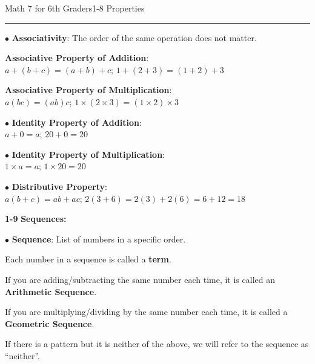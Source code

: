 \begin{enumerate*}
\begin{enumerate*}
\newpage
\noindent\Large{Math 7 for 6th Graders\hfill 1-8 Properties}
\noindent\hrule
\vspace{5mm}
					
				\item[$\bullet$]\textbf{Associativity}: The order of the same operation does not matter.\\
					\item[]\textbf{Associative Property of Addition}:\\
						$a+(b+c)=(a+b)+c$; $1+(2+3)=(1+2)+3$\\
					\item[]\textbf{Associative Property of Multiplication}:\\
						$a(bc)=(ab)c$; $1\times(2\times3)=(1\times2)\times3$\\
				\item[$\bullet$]\textbf{Identity Property of Addition}:\\
					$a+0=a$; $20+0=20$\\
				\item[$\bullet$]\textbf{Identity Property of Multiplication}:\\
					$1\times a=a$; $1\times20=20$\\
				\item[$\bullet$]\textbf{Distributive Property}:\\
					$a(b+c)=ab+ac$; $2(3+6)=2(3)+2(6)=6+12=18$\\
			\end{enumerate*}

		\item[\Large\textbf{1-9}] \Large\textbf{Sequences:}\\
			\begin{enumerate*}
				\item[$\bullet$]\textbf{Sequence}: List of numbers in a specific order.\\
				\item[]Each number in a sequence is called a \textbf{term}.\\
				\item[]If you are adding/subtracting the same number each time, it is called an \textbf{Arithmetic Sequence}.\\
				\item[]If you are multiplying/dividing by the same number each time, it is called a \textbf{Geometric Sequence}.\\
				\item[]If there is a pattern but it is neither of the above, we will refer to the sequence as ``neither''.\\
			\end{enumerate*}


\end{enumerate*}
